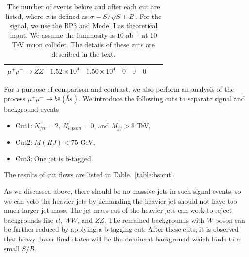 \documentclass[a4paper,11pt]{article}
\begin{document}
\begin{center}
\begin{table}
\begin{center}
\begin{tabular}{|c|c|c|c|c|c|c|c|}
  $\mu^+\mu^-\to ZZ$  & $1.52\times{10^4}$   & $1.50\times{10^4}$  &  $0$   &  $0$ & $0$  &  & \\
  \hline
  \end{tabular}
  \end{center}
  \caption{The number of events before and after each cut are listed, where $\sigma$ is defined as $\sigma=S/\sqrt{S+B}$. For the signal, we use the BP3 and Model I as theoretical input. We assume the luminosity is $10$ ab$^{-1}$ at 10 TeV muon collider. The details of these cuts are described in the text.\label{table:tc:cut}}
\end{table}
\end{center}

For a purpose of comparison and contrast, we also perform an analysis of the process $\mu^+\mu^-\to b\bar{s}(\bar{b}s)$. We introduce the following cuts to separate signal and background events 
\begin{itemize}
  \item Cut1: $N_{jet}=2$, $N_{lepton}=0$, and $M_{jj}>8$ TeV,
  \item Cut2: $M(HJ)<75$ GeV,
  \item Cut3: One jet is b-tagged.
\end{itemize} 
The results of cut flows are listed in Table.~\ref{table:bs:cut}.

As we discussed above, there should be no massive jets in such signal events, 
so we can veto the heavier jets by demanding the heavier jet should not have too much larger jet mass.
The jet mass cut of the heavier jets can work to reject backgrounds like $t\bar{t}$, $WW$, and $ZZ$.
The remained backgrounds with $W$ boson can be further reduced by applying a b-tagging cut. 
After these cuts, it is observed that heavy flavor final states will be the dominant background which leads to a small $S/B$.
\end{document}
